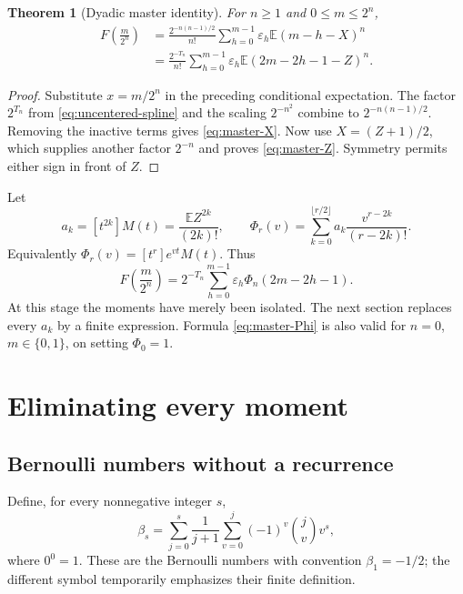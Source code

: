 \documentclass[11pt,a4paper]{article}
\numberwithin{equation}{section}
\newtheorem{theorem}{Theorem}[section]
\theoremstyle{definition}
\theoremstyle{remark}
\newcommand{\E}{\mathbb E}
\newcommand{\eps}{\varepsilon}
\newcommand{\coeff}[2]{[#1^{#2}]}
\begin{document}
\begin{theorem}[Dyadic master identity]
\label{thm:master}
For $n\ge1$ and $0\le m\le2^n$,
\begin{align}
 F\!\left(\frac m{2^n}\right)
 &=\frac{2^{-n(n-1)/2}}{n!}
   \sum_{h=0}^{m-1}\eps_h\E(m-h-X)^n\label{eq:master-X}\\
 &=\frac{2^{-T_n}}{n!}
   \sum_{h=0}^{m-1}\eps_h\E(2m-2h-1-Z)^n.
 \label{eq:master-Z}
\end{align}
\end{theorem}
\begin{proof}
Substitute $x=m/2^n$ in the preceding conditional expectation. The factor $2^{T_n}$ from \cref{eq:uncentered-spline} and the scaling $2^{-n^2}$ combine to $2^{-n(n-1)/2}$. Removing the inactive terms gives \cref{eq:master-X}. Now use $X=(Z+1)/2$, which supplies another factor $2^{-n}$ and proves \cref{eq:master-Z}. Symmetry permits either sign in front of $Z$.
\end{proof}

Let
\begin{equation}
 a_k=\coeff{t}{2k}M(t)=\frac{\E Z^{2k}}{(2k)!},
 \qquad
 \Phi_r(v)=\sum_{k=0}^{\lfloor r/2\rfloor}
           a_k\frac{v^{r-2k}}{(r-2k)!}.
 \label{eq:a-Phi}
\end{equation}
Equivalently $\Phi_r(v)=\coeff{t}{r}e^{vt}M(t)$. Thus
\begin{equation}
 F\!\left(\frac m{2^n}\right)
 =2^{-T_n}\sum_{h=0}^{m-1}\eps_h\Phi_n(2m-2h-1).
 \label{eq:master-Phi}
\end{equation}
At this stage the moments have merely been isolated. The next section replaces every $a_k$ by a finite expression. Formula \cref{eq:master-Phi} is also valid for $n=0$, $m\in\{0,1\}$, on setting $\Phi_0=1$.

\section{Eliminating every moment}
\label{sec:moment-elimination}

\subsection{Bernoulli numbers without a recurrence}
\label{sec:cumulants}
Define, for every nonnegative integer $s$,
\begin{equation}
 \beta_s=\sum_{j=0}^{s}\frac1{j+1}
         \sum_{v=0}^{j}(-1)^v\binom jv v^s,
 \label{eq:Bernoulli-finite}
\end{equation}
where $0^0=1$. These are the Bernoulli numbers with convention $\beta_1=-1/2$; the different symbol temporarily emphasizes their finite definition.
\end{document}
